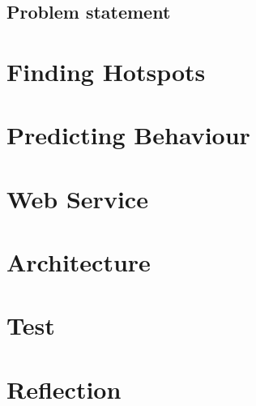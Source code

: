 \section{Problem statement}\label{problem_statement}



\chapter{Finding Hotspots}





\chapter{Predicting Behaviour}





\chapter{Web Service}\label{chap:webservice}




\chapter{Architecture}





\chapter{Test}



\chapter{Reflection}



\appendix






